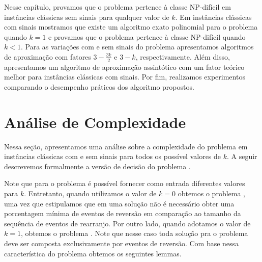 Nesse capítulo, provamos que o problema \SbPRT{} pertence à classe NP-difícil em instâncias clássicas sem sinais para qualquer valor de $k$. Em instâncias clássicas com sinais mostramos que existe um algoritmo exato polinomial para o problema quando $k=1$ e provamos que o problema pertence à classe NP-difícil quando $k < 1$. Para as variações com e sem sinais do problema \SbPRT{} apresentamos algoritmos de aproximação com fatores $3 - \frac{3k}{2}$ e $3-k$, respectivamente. Além disso, apresentamos um algoritmo de aproximação assintótico com um fator teórico melhor para instâncias clássicas com sinais. Por fim, realizamos experimentos comparando o desempenho práticos dos algoritmo propostos.  

\section{Análise de Complexidade}

Nessa seção, apresentamos uma análise sobre a complexidade do problema \SbPRT{} em instâncias clássicas com e sem sinais para todos os possível valores de $k$. A seguir descrevemos formalmente a versão de decisão do problema \SbPRT{}.

\begin{decision}
\end{decision}

Note que para o problema \SbPRT{} é possível fornecer como entrada diferentes valores para $k$. Entretanto, quando utilizamos o valor de $k=0$ obtemos o problema \SbRT{}, uma vez que estipulamos que em uma solução não é necessário obter uma porcentagem mínima de eventos de reversão em comparação ao tamanho da sequência de eventos de rearranjo. Por outro lado, quando adotamos o valor de $k=1$, obtemos o problema \SbR{}. Note que nesse caso toda solução pra o problema deve ser composta exclusivamente por eventos de reversão. Com base nessa característica do problema obtemos os seguintes lemmas.


